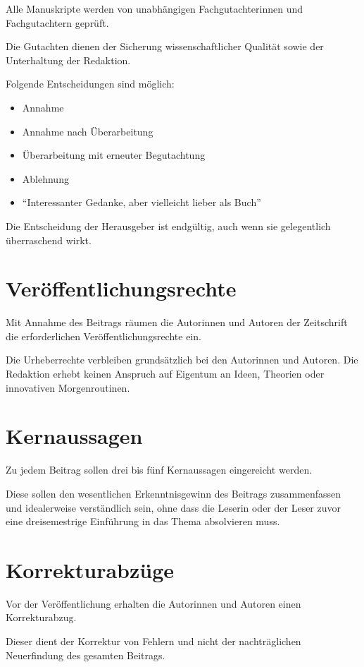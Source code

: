 \documentclass[research]{zal}
\begin{document}
Alle Manuskripte werden von unabhängigen Fachgutachterinnen und Fachgutachtern geprüft.

Die Gutachten dienen der Sicherung wissenschaftlicher Qualität sowie der Unterhaltung der Redaktion.

Folgende Entscheidungen sind möglich:

\begin{itemize}
	\item Annahme
	\item Annahme nach Überarbeitung
	\item Überarbeitung mit erneuter Begutachtung
	\item Ablehnung
	\item ``Interessanter Gedanke, aber vielleicht lieber als Buch''
\end{itemize}

Die Entscheidung der Herausgeber ist endgültig, auch wenn sie gelegentlich überraschend wirkt.

\section{Veröffentlichungsrechte}

Mit Annahme des Beitrags räumen die Autorinnen und Autoren der Zeitschrift die erforderlichen Veröffentlichungsrechte ein.

Die Urheberrechte verbleiben grundsätzlich bei den Autorinnen und Autoren. Die Redaktion erhebt keinen Anspruch auf Eigentum an Ideen, Theorien oder innovativen Morgenroutinen.

\section{Kernaussagen}

Zu jedem Beitrag sollen drei bis fünf Kernaussagen eingereicht werden.

Diese sollen den wesentlichen Erkenntnisgewinn des Beitrags zusammenfassen und idealerweise verständlich sein, ohne dass die Leserin oder der Leser zuvor eine dreisemestrige Einführung in das Thema absolvieren muss.

\section{Korrekturabzüge}

Vor der Veröffentlichung erhalten die Autorinnen und Autoren einen Korrekturabzug.

Dieser dient der Korrektur von Fehlern und nicht der nachträglichen Neuerfindung des gesamten Beitrags.
\end{document}
